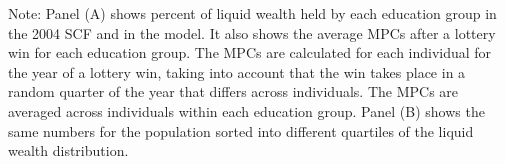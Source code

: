 \documentclass{econsocart}
\begin{document}
\begin{table}[tb]
  \noindent\parbox{\textwidth}{
    \medskip
    \footnotesize Note: Panel (A) shows percent of liquid wealth held by each education group in the 2004 SCF and in the model. It also shows the average MPCs after a lottery win for each education group. The MPCs are calculated for each individual for the year of a lottery win, taking into account that the win takes place in a random quarter of the year that differs across individuals. The MPCs are averaged across individuals within each education group. Panel (B) shows the same numbers for the population sorted into different quartiles of the liquid wealth distribution.
  }
\end{table}
\end{document}
